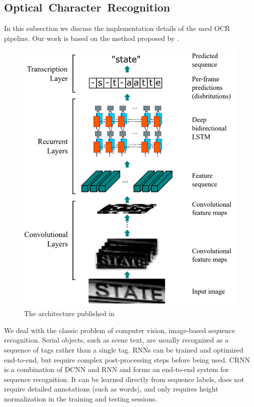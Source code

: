 \subsection{Optical~Character~Recognition}
\label{subsec:ocr}

In this subsection we discuss the implementation details of the used \ac{OCR} pipeline.
Our work is based on the method proposed by \cite{7801919}.
\begin{figure}
	\includegraphics[width=\textwidth]{figures/crnn.png}
	\caption{The architecture published in \cite{7801919}}
	\label{fig:ocr_architecture}
\end{figure}

We deal with the classic problem of computer vision, image-based sequence
recognition. Serial objects, such as scene text, are usually recognized as
a sequence of tags rather than a single tag. RNNs can be trained and optimized
end-to-end, but require complex post-processing steps before being used. CRNN is
a combination of DCNN and RNN and forms an end-to-end system for sequence
recognition. It can be learned directly from sequence labels, does not require
detailed annotations (such as words), and only requires height normalization in
the training and testing sessions.


